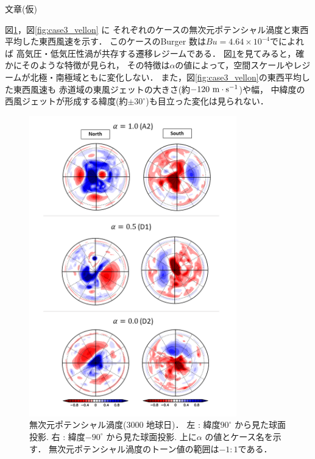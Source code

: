 \documentclass[a4j,12pt,openbib,oneside]{jreport}
\begin{document}
文章(仮) 

図\ref{fig:case3_nonqv}，図\ref{fig:case3_vellon} に
それぞれのケースの無次元ポテンシャル渦度と東西平均した東西風速を示す．
このケースのBurger 数は$Bu = 4.64\times 10^{-4}$で\cite{Brueshaber2019}によれば
高気圧・低気圧性渦が共存する遷移レジームである．
%
図\ref{fig:case3_nonqv}を見てみると，確かにそのような特徴が見られ，
その特徴は$\alpha$の値によって，空間スケールやレジームが北極・南極域ともに変化しない．
%
また，図\ref{fig:case3_vellon}の東西平均した東西風速も
赤道域の東風ジェットの大きさ(約$-120 \rm{~m \cdot s^{-1}}$)や幅，
中緯度の西風ジェットが形成する緯度(約$\pm 30^\circ$)も目立った変化は見られない．
%
\begin{figure}[ht]
  \begin{center}
    \includegraphics[clip,width=9cm]{./fig/result/case3/case3_nonqv.png}
    \caption{
      \footnotesize{無次元ポテンシャル渦度(3000 地球日)．
左 : 緯度$90^\circ$ から見た球面投影.
右 : 緯度$-90^\circ$ から見た球面投影.
上に$\alpha$ の値とケース名を示す．
無次元ポテンシャル渦度のトーン値の範囲は$-1:1$である．
      }
    }
    \label{fig:case3_nonqv}
  \end{center}
\end{figure}
\clearpage
%
%
\end{document}
